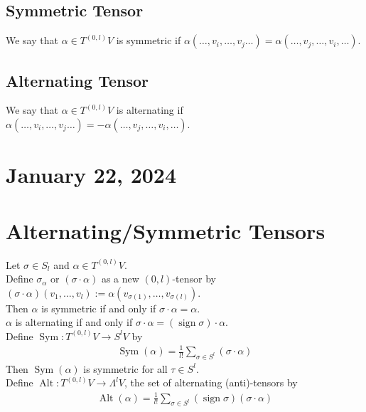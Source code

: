 \documentclass[11pt]{article}
\begin{document}
\subsection*{Symmetric Tensor}
\label{sec:orgaa60b01}
We say that \(\alpha\in T^{(0,l)}V\) is symmetric if \(\alpha(\ldots,v_{i},\ldots,v_{j}\ldots)=\alpha(\ldots,v_{j},\ldots,v_{i},\ldots)\).\\
\subsection*{Alternating Tensor}
\label{sec:org33d1d19}
We say that \(\alpha\in T^{(0,l)}V\) is alternating if \(\alpha(\ldots,v_{i},\ldots,v_{j}\ldots)=-\alpha(\ldots,v_{j},\ldots,v_{i},\ldots)\).\\
\section*{January 22, 2024}
\label{sec:orgc5c51bc}
\section*{Alternating/Symmetric Tensors}
\label{sec:orgf4aaf90}
Let \(\sigma\in S_{l}\) and \(\alpha\in T^{(0,l)}V\).\\
Define \(\sigma_{\alpha}\) or \((\sigma\cdot\alpha)\) as a new \((0,l)\)-tensor by \((\sigma\cdot\alpha)(v_{1},\ldots,v_{l}):=\alpha(v_{\sigma(1)},\ldots,v_{\sigma(l)})\).\\
Then \(\alpha\) is symmetric if and only if \(\sigma\cdot\alpha=\alpha\).\\
\(\alpha\) is alternating if and only if \(\sigma\cdot\alpha=(\operatorname{sign}\sigma)\cdot\alpha\).\\
Define \(\operatorname{Sym}:T^{(0,l)}V\to S^{l}V\) by\\
\begin{align*}
  \operatorname{Sym}(\alpha)=\frac{1}{l!}\sum_{\sigma\in S^{l}}(\sigma\cdot\alpha)
\end{align*}
Then \(\operatorname{Sym}(\alpha)\) is symmetric for all \(\tau\in S^{l}\).\\
Define \(\operatorname{Alt}:T^{(0,l)}V\to\Lambda^{l}V\), the set of alternating (anti)-tensors by\\
\begin{align*}
  \operatorname{Alt}(\alpha)=\frac{1}{l!}\sum_{\sigma\in S^{l}}(\operatorname{sign}\sigma)(\sigma\cdot\alpha)
\end{align*}
\end{document}
